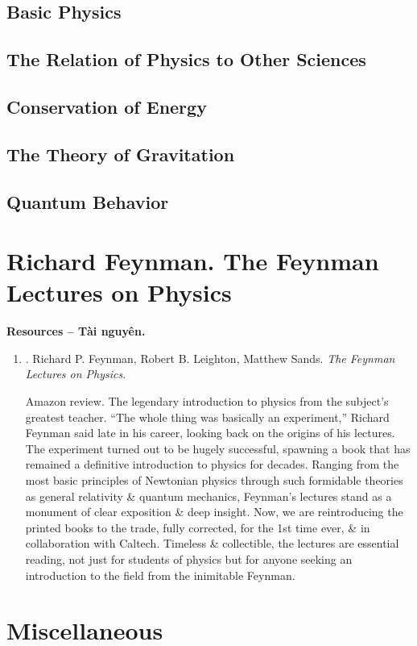 \documentclass{article}
\begin{document}
\subsection{Basic Physics}

\subsection{The Relation of Physics to Other Sciences}

\subsection{Conservation of Energy}

\subsection{The Theory of Gravitation}

\subsection{Quantum Behavior}


\section{{\sc Richard Feynman}. The Feynman Lectures on Physics}
\textbf{\textsf{Resources -- Tài nguyên.}}
\begin{enumerate}
	\item \cite{Feyman_Leighton_Sands_lecture_physics}. {\sc Richard P. Feynman, Robert B. Leighton, Matthew Sands}. {\it The Feynman Lectures on Physics}. {}
	
	{\sf Amazon review.} The legendary introduction to physics from the subject's greatest teacher. ``The whole thing was basically an experiment,'' {\sc Richard Feynman} said late in his career, looking back on the origins of his lectures. The experiment turned out to be hugely successful, spawning a book that has remained a definitive introduction to physics for decades. Ranging from the most basic principles of Newtonian physics through such formidable theories as general relativity \& quantum mechanics, {\sc Feynman}'s lectures stand as a monument of clear exposition \& deep insight. Now, we are reintroducing the printed books to the trade, fully corrected, for the 1st time ever, \& in collaboration with Caltech. Timeless \& collectible, the lectures are essential reading, not just for students of physics but for anyone seeking an introduction to the field from the inimitable {\sc Feynman}.
\end{enumerate}


\section{Miscellaneous}


\printbibliography[heading=bibintoc]
	
\end{document}
